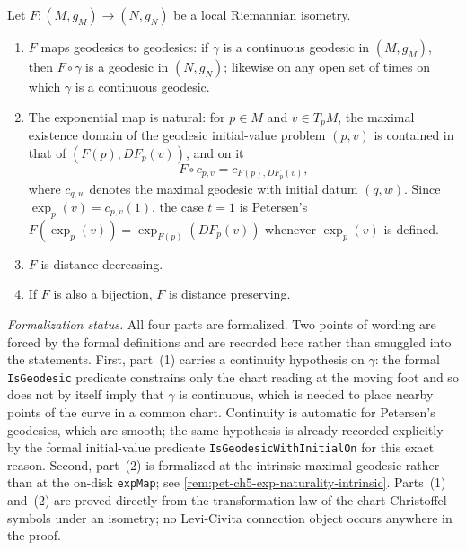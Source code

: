 \begin{proposition}
  \label{prop:pet-ch5-local-isometry-properties}


  Let $F:(M,g_M)\to(N,g_N)$ be a local Riemannian isometry.
  \begin{enumerate}
  \item[(1)] $F$ maps geodesics to geodesics: if $\gamma$ is a continuous geodesic
  in $(M,g_M)$, then $F\circ\gamma$ is a geodesic in $(N,g_N)$; likewise on any
  open set of times on which $\gamma$ is a continuous geodesic.
  \item[(2)] The exponential map is natural: for $p\in M$ and $v\in T_pM$, the
  maximal existence domain of the geodesic initial-value problem $(p,v)$ is
  contained in that of $(F(p),DF_p(v))$, and on it
  \[
    F\circ c_{p,v}=c_{F(p),DF_p(v)},
  \]
  where $c_{q,w}$ denotes the maximal geodesic with initial datum $(q,w)$. Since
  $\exp_p(v)=c_{p,v}(1)$, the case $t=1$ is Petersen's
  $F(\exp_p(v))=\exp_{F(p)}(DF_p(v))$ whenever $\exp_p(v)$ is defined.
  \item[(3)] $F$ is distance decreasing.
  \item[(4)] If $F$ is also a bijection, $F$ is distance preserving.
  \end{enumerate}

  \emph{Formalization status.} All four parts are formalized. Two points of
  wording are forced by the formal definitions and are recorded here rather than
  smuggled into the statements. First, part~(1) carries a continuity hypothesis on
  $\gamma$: the formal \texttt{IsGeodesic} predicate constrains only the chart
  reading at the moving foot and so does not by itself imply that $\gamma$ is
  continuous, which is needed to place nearby points of the curve in a common
  chart. Continuity is automatic for Petersen's geodesics, which are smooth; the
  same hypothesis is already recorded explicitly by the formal
  initial-value predicate \texttt{IsGeodesicWithInitialOn} for this exact reason.
  Second, part~(2) is formalized at the intrinsic maximal geodesic rather than at
  the on-disk \texttt{expMap}; see
  \cref{rem:pet-ch5-exp-naturality-intrinsic}. Parts~(1) and~(2) are proved
  directly from the transformation law of the chart Christoffel symbols under an
  isometry; no Levi-Civita connection object occurs anywhere in the proof.
\end{proposition}
